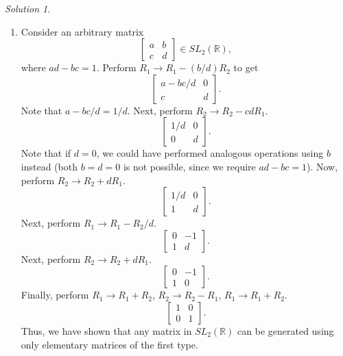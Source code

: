 \documentclass[11pt]{report}
\def\R{\mathbb{R}}
\theoremstyle{remark}
\newtheorem*{solution}{Solution}
\begin{document}
\begin{solution}
\begin{enumerate}
        \item Consider an arbitrary matrix \[
           \begin{bmatrix}
               a & b \\ c & d
           \end{bmatrix} \in SL_2(\R),
        \] where $ad - bc = 1$. Perform $R_1 \to R_1 - (b / d)R_2$ to get \[
            \begin{bmatrix}
                a - bc / d & 0 \\ c & d
            \end{bmatrix}.
        \] Note that $a - bc / d = 1 / d$. Next, perform $R_2 \to R_2 - cdR_1$. \[
            \begin{bmatrix}
                1 / d & 0 \\ 0 & d
            \end{bmatrix}.
        \] Note that if $d = 0$, we could have performed analogous operations using
        $b$ instead (both $b = d = 0$ is not possible, since we require $ad - bc =
        1$). Now, perform $R_2 \to R_2 + dR_1$. \[
            \begin{bmatrix}
                1 / d & 0 \\ 1 & d
            \end{bmatrix}.
        \] Next, perform $R_1 \to R_1 - R_2 / d$. \[
            \begin{bmatrix}
                0 & -1 \\ 1 & d
            \end{bmatrix}.
        \] Next, perform $R_2 \to R_2 + dR_1$. \[
            \begin{bmatrix}
                0 & -1 \\ 1 & 0
            \end{bmatrix}.
        \] Finally, perform $R_1 \to R_1 + R_2$, $R_2 \to R_2 - R_1$, $R_1 \to R_1 +
        R_2$. \[
            \begin{bmatrix}
                1 & 0 \\ 0 & 1
            \end{bmatrix}.
        \] Thus, we have shown that any matrix in $SL_2(\R)$ can be generated using
        only elementary matrices of the first type.


\end{enumerate}
\end{solution}
\end{document}
